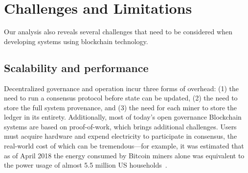 \section{Challenges and Limitations}
\label{sec:challenges}

Our analysis also reveals several challenges that need to be considered when developing systems using blockchain technology.


\subsection{Scalability and performance}

Decentralized governance and operation incur three forms of overhead: (1) the 
need to run a consensus protocol before state can be updated, (2) the need to 
store the full system provenance, and (3) the need for each miner to store the 
ledger in its entirety. %
Additionally, most of today's open governance Blockchain systems are based on 
proof-of-work, which brings additional challenges.
Users must acquire hardware and expend electricity to participate in consensus, 
the real-world cost of which can be tremendous---for example, it was estimated 
that as of April 2018 the energy consumed by Bitcoin miners alone was 
equivalent to the power usage of almost 5.5 million US 
households~\cite{Digiconomist}.


